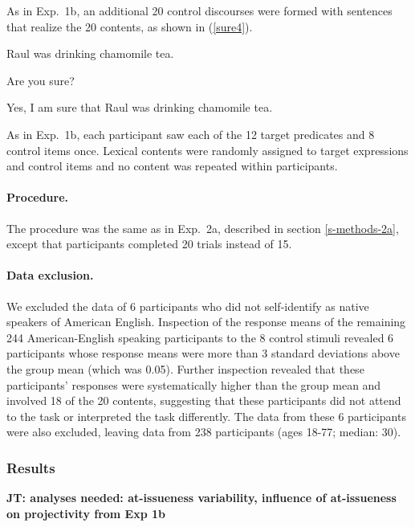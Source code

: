 \documentclass[11pt,fleqn]{article}
\newcommand{\6}{\mbox{$[\hspace*{-.6mm}[$}}
\newcommand{\9}{\mbox{$]\hspace*{-.6mm}]$}}
\newcommand{\jt}[1]{\textbf{\color{blue}JT: #1}}
\begin{document}
As in Exp.~1b, an additional 20 control discourses were formed with sentences that realize the 20 contents, as shown in (\ref{sure4}).

\begin{exe}
\ex\label{sure4}
\begin{xlist}
 Raul was drinking chamomile tea.

 Are you sure?

 Yes, I am sure that Raul was drinking chamomile tea.
\end{xlist}
\end{exe}
As in Exp.~1b, each participant saw each of the 12 target predicates and 8 control items once. Lexical contents were randomly assigned to target expressions and control items and no content was repeated within participants. 

\paragraph{Procedure.} The procedure was the same as in Exp.~2a, described in section \ref{s-methods-2a}, except that participants completed 20 trials instead of 15.

\paragraph{Data exclusion.} We excluded the data of 6 participants who did not self-identify as native speakers of American English. Inspection of the response means of the remaining 244 American-English speaking participants to the 8 control stimuli revealed 6 participants whose response means were more than 3 standard deviations above the group mean (which was 0.05). Further inspection revealed that these participants' responses were systematically higher than the group mean and involved 18 of the 20 contents, suggesting that these participants did not attend to the task or interpreted the task differently. The data from these 6 participants were also excluded, leaving data from 238 participants (ages 18-77; median: 30).


\subsubsection{Results}

\jt{analyses needed: at-issueness variability, influence of at-issueness on projectivity from Exp 1b}
\end{document}
